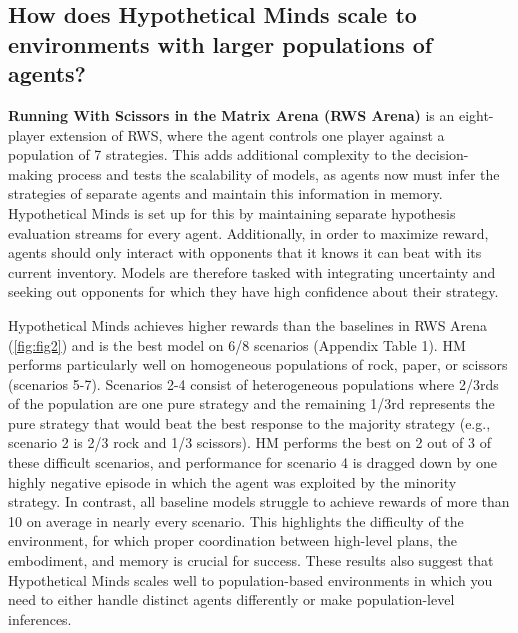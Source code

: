 \documentclass{article} %
\begin{document}
\vspace{-10pt}

\subsection{How does Hypothetical Minds scale to environments with larger populations of agents?}
\vspace{-5pt}

\noindent \textbf{Running With Scissors in the Matrix Arena (RWS Arena)} is an eight-player extension of RWS, where the agent controls one player against a population of 7 strategies. This adds additional complexity to the decision-making process and tests the scalability of models, as agents now must infer the strategies of separate agents and maintain this information in memory. Hypothetical Minds is set up for this by maintaining separate hypothesis evaluation streams for every agent. Additionally, in order to maximize reward, agents should only interact with opponents that it knows it can beat with its current inventory. Models are therefore tasked with integrating uncertainty and seeking out opponents for which they have high confidence about their strategy.

Hypothetical Minds achieves higher rewards than the baselines in RWS Arena (\autoref{fig:fig2}) and is the best model on 6/8 scenarios (Appendix Table 1). HM performs particularly well on homogeneous populations of rock, paper, or scissors (scenarios 5-7). Scenarios 2-4 consist of heterogeneous populations where 2/3rds of the population are one pure strategy and the remaining 1/3rd represents the pure strategy that would beat the best response to the majority strategy (e.g., scenario 2 is 2/3 rock and 1/3 scissors). HM performs the best on 2 out of 3 of these difficult scenarios, and performance for scenario 4 is dragged down by one highly negative episode in which the agent was exploited by the minority strategy. In contrast, all baseline models struggle to achieve rewards of more than 10 on average in nearly every scenario. This highlights the difficulty of the environment, for which proper coordination between high-level plans, the embodiment, and memory is crucial for success. These results also suggest that Hypothetical Minds scales well to population-based environments in which you need to either handle distinct agents differently or make population-level inferences.

\end{document}
